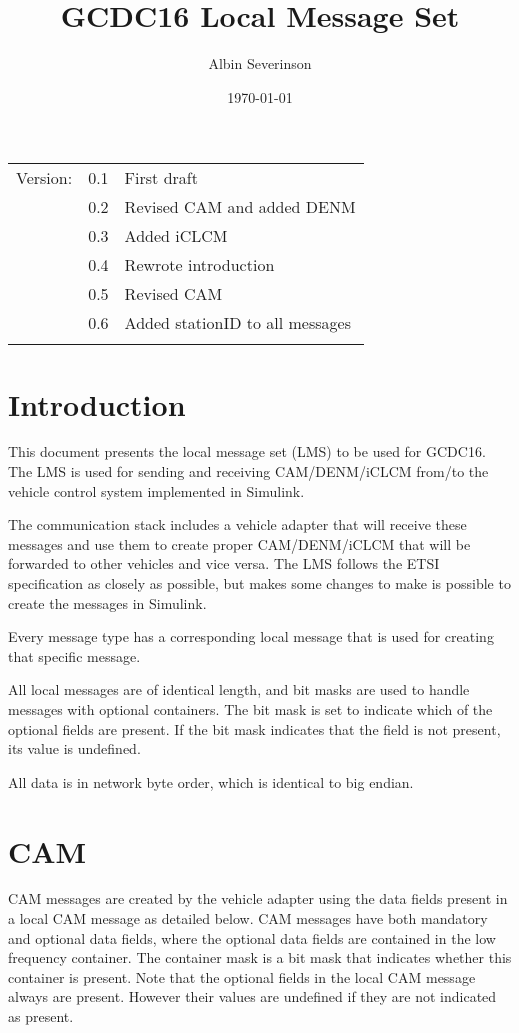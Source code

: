 \documentclass[11pt]{article}
\author{Albin Severinson}
\date{\today}
\title{GCDC16 Local Message Set}
\begin{document}
\maketitle
\tableofcontents

\begin{center}
\begin{tabular}{lrl}
Version: & 0.1 & First draft\\
 & 0.2 & Revised CAM and added DENM\\
 & 0.3 & Added iCLCM\\
 & 0.4 & Rewrote introduction\\
 & 0.5 & Revised CAM\\
 & 0.6 & Added stationID to all messages\\
 &  & \\
\end{tabular}
\end{center}

\newpage
\section{Introduction}
\label{sec:orgheadline1}
This document presents the local message set (LMS) to be used for
GCDC16. The LMS is used for sending and receiving CAM/DENM/iCLCM
from/to the vehicle control system implemented in Simulink.

The communication stack includes a vehicle adapter that will receive
these messages and use them to create proper CAM/DENM/iCLCM
that will be forwarded to other vehicles and vice versa. The LMS
follows the ETSI specification as closely as possible, but makes some
changes to make is possible to create the messages in Simulink.

Every message type has a corresponding local message that is used for
creating that specific message. 

All local messages are of identical length, and bit masks are used to
handle messages with optional containers. The bit mask is set to
indicate which of the optional fields are present. If the bit mask
indicates that the field is not present, its value is undefined.

All data is in network byte order, which is identical to big endian.

\newpage
\section{CAM}
\label{sec:orgheadline2}
CAM messages are created by the vehicle adapter using the data fields
present in a local CAM message as detailed below. CAM messages have
both mandatory and optional data fields, where the optional data
fields are contained in the low frequency container. The container
mask is a bit mask that indicates whether this container is present.
Note that the optional fields in the local CAM message always are
present. However their values are undefined if they are not indicated
as present.
\end{document}
